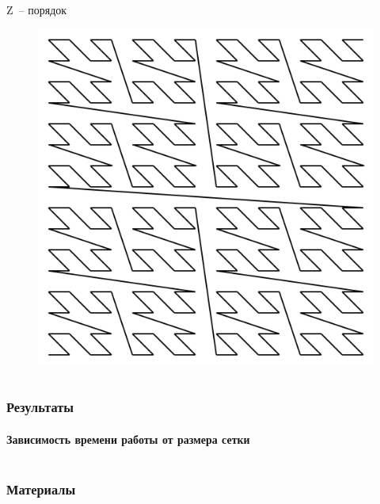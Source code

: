 \documentclass[presentation,18pt]{beamer}
\begin{document}
\begin{frame}[t]
\begin{columns}
\begin{block}{Z~-- порядок}
			\begin{figure}
				\includegraphics[width=\textwidth]{img/ZOrderCurve.png}
			\end{figure}
		\end{block}

	\end{columns}
\end{frame}

\begin{frame}
	\label{conclusion}
	\frametitle{Результаты}
	\framesubtitle{Зависимость времени работы от размера сетки}

	\begin{columns}


		\begin{block}{}
			\vspace{180pt}
		\end{block}


	\end{columns}
\end{frame}

\begin{frame}
	\label{materials}
	\frametitle{Материалы}
\end{frame}
\end{document}
